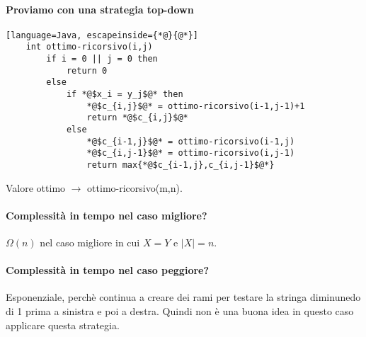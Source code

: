 \paragraph*{Proviamo con una strategia top-down}
\begin{lstlisting}[language=Java, escapeinside={*@}{@*}]
    int ottimo-ricorsivo(i,j)
        if i = 0 || j = 0 then
            return 0
        else
            if *@$x_i = y_j$@* then
                *@$c_{i,j}$@* = ottimo-ricorsivo(i-1,j-1)+1
                return *@$c_{i,j}$@*
            else
                *@$c_{i-1,j}$@* = ottimo-ricorsivo(i-1,j)
                *@$c_{i,j-1}$@* = ottimo-ricorsivo(i,j-1)
                return max{*@$c_{i-1,j},c_{i,j-1}$@*}
\end{lstlisting}
Valore ottimo $\rightarrow$ ottimo-ricorsivo(m,n).
\paragraph*{Complessità in tempo nel caso migliore?} $\Omega(n)$ nel caso migliore in cui $X=Y$ e
$|X|=n$.\\
\paragraph*{Complessità in tempo nel caso peggiore?} Esponenziale, perchè continua a creare dei
rami per testare la stringa diminunedo di 1 prima a sinistra e poi a destra. Quindi non è una
buona idea in questo caso applicare questa strategia.
